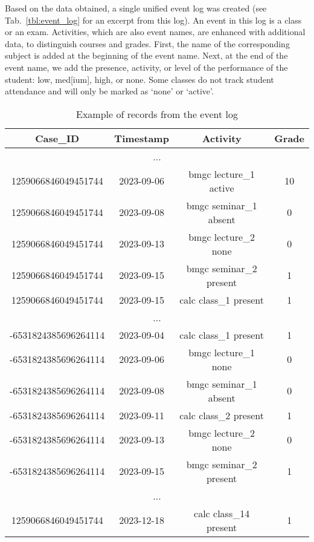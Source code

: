 \documentclass[11pt]{article}
\theoremstyle{definition}
\begin{document}
Based on the data obtained, a single unified event log was created (see Tab.~\ref{tbl:event_log} for an excerpt from this log). 
An event in this log is a class or an exam. 
Activities, which are also event names, are enhanced with additional data, to distinguish courses and grades. First, the name of the corresponding subject is added at the beginning of the event name. Next, at the end of the event name, we add the presence, activity, or level of the performance of the student: low, med[ium], high, or none. Some classes do not track student attendance and will only be marked as `none' or `active'.

\begin{table}[htb]
    \centering
    \caption{Example of records from the event log}
    
    \begin{tabular}{c c c c} 
    \textbf{Case\_ID} & \textbf{Timestamp} & \textbf{Activity} & \textbf{Grade} \\ \hline\hline
    \multicolumn{4}{c}{...}\\
    \hline
    1259066846049451744 & 2023-09-06 & bmgc lecture\_1 active & 10 \\
    \hline
    1259066846049451744 & 2023-09-08 & bmgc seminar\_1 absent & 0 \\
    \hline
    1259066846049451744 & 2023-09-13 & bmgc lecture\_2 none & 0 \\
    \hline
    1259066846049451744 & 2023-09-15 & bmgc seminar\_2 present & 1 \\
    \hline
    1259066846049451744 & 2023-09-15 & calc class\_1 present & 1 \\
    \hline
    \multicolumn{4}{c}{...}\\
    \hline
    -6531824385696264114 & 2023-09-04 & calc class\_1 present & 1 \\
    \hline
    -6531824385696264114 & 2023-09-06 & bmgc lecture\_1 none & 0 \\
    \hline
    -6531824385696264114 & 2023-09-08 & bmgc seminar\_1 absent & 0 \\
    \hline
    -6531824385696264114 & 2023-09-11 & calc class\_2 present & 1 \\
    \hline
    -6531824385696264114 & 2023-09-13 & bmgc lecture\_2 none & 0 \\
    \hline
    -6531824385696264114 & 2023-09-15 & bmgc seminar\_2 present & 1 \\
    \hline
    \multicolumn{4}{c}{...}\\
    \hline
    1259066846049451744 & 2023-12-18 & calc class\_14 present & 1 \\

\end{tabular}
\end{table}
\end{document}
